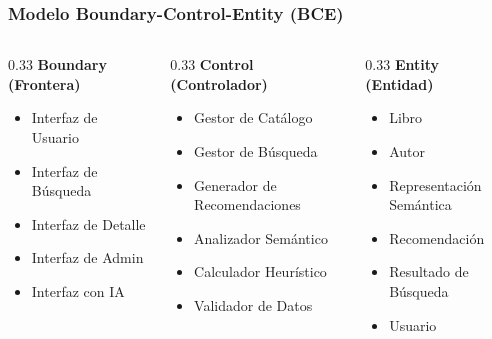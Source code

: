 \documentclass[aspectratio=169]{beamer}
\begin{document}
\begin{frame}
\frametitle{Modelo Boundary-Control-Entity (BCE)}

\begin{columns}
\begin{column}{0.33\textwidth}
\textbf{Boundary (Frontera)}
\begin{itemize}
\item Interfaz de Usuario
\item Interfaz de Búsqueda
\item Interfaz de Detalle
\item Interfaz de Admin
\item Interfaz con IA
\end{itemize}
\end{column}

\begin{column}{0.33\textwidth}
\textbf{Control (Controlador)}
\begin{itemize}
\item Gestor de Catálogo
\item Gestor de Búsqueda
\item Generador de Recomendaciones
\item Analizador Semántico
\item Calculador Heurístico
\item Validador de Datos
\end{itemize}
\end{column}

\begin{column}{0.33\textwidth}
\textbf{Entity (Entidad)}
\begin{itemize}
\item Libro
\item Autor
\item Representación Semántica
\item Recomendación
\item Resultado de Búsqueda
\item Usuario
\end{itemize}
\end{column}
\end{columns}

\vspace{0.5cm}

\begin{center}
\end{center}

\end{frame}
\end{document}
